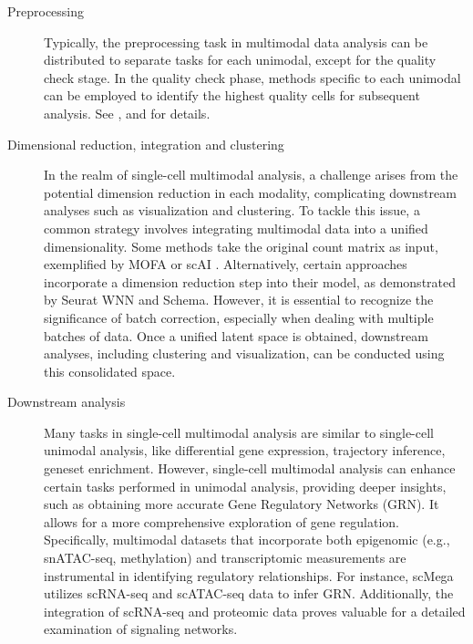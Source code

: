 \begin{description}
	\item[Preprocessing]
	Typically, the preprocessing task in multimodal data analysis can be distributed to separate tasks for each unimodal, except for the quality check stage. In the quality check phase, methods specific to each unimodal can be employed to identify the highest quality cells for subsequent analysis. See ,  and  for details.

	\item[Dimensional reduction, integration and clustering]
	In the realm of single-cell multimodal analysis, a challenge arises from the potential dimension reduction in each modality, complicating downstream analyses such as visualization and clustering. To tackle this issue, a common strategy involves integrating multimodal data into a unified dimensionality. Some methods take the original count matrix as input, exemplified by MOFA \citep{argelaguet2020mofa+} or scAI \citep{jin2020scai}. Alternatively, certain approaches incorporate a dimension reduction step into their model, as demonstrated by Seurat WNN and Schema\citep{hao2021seurat4,singh2021schema}. However, it is essential to recognize the significance of batch correction, especially when dealing with multiple batches of data. Once a unified latent space is obtained, downstream analyses, including clustering and visualization, can be conducted using this consolidated space.

	\item[Downstream analysis]
	Many tasks in single-cell multimodal analysis are similar to single-cell unimodal analysis, like differential gene expression, trajectory inference, geneset enrichment. However, single-cell multimodal analysis can enhance certain tasks performed in unimodal analysis, providing deeper insights, such as obtaining more accurate Gene Regulatory Networks (GRN). It allows for a more comprehensive exploration of gene regulation. Specifically, multimodal datasets that incorporate both epigenomic (e.g., snATAC-seq, methylation) and transcriptomic measurements are instrumental in identifying regulatory relationships. For instance, scMega \citep{li2023scmega} utilizes scRNA-seq and scATAC-seq data to infer GRN. Additionally, the integration of scRNA-seq and proteomic data proves valuable for a detailed examination of signaling networks. 
\end{description}

